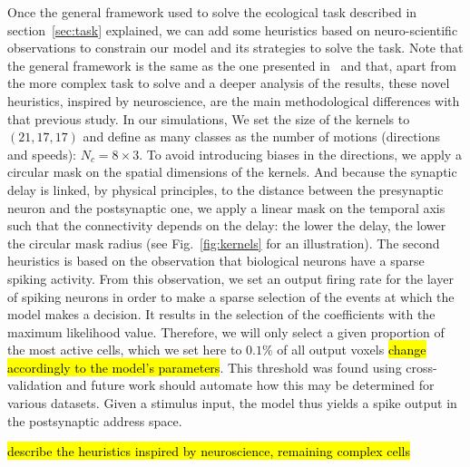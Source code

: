 \documentclass[default]{sn-jnl}%
\theoremstyle{thmstyleone}%
\theoremstyle{thmstyletwo}%
\theoremstyle{thmstylethree}%
\newcommand{\seeFig}[1]{see Fig.~\ref{fig:#1}}%
\newcommand{\class}{c} %
\newcommand{\note}[1]{{\sethlcolor{yellow}\hl{#1}}}
\begin{document}
Once the general framework used to solve the ecological task described in section~\ref{sec:task} explained, we can add some heuristics based on neuro-scientific observations to constrain our model and its strategies to solve the task. Note that the general framework is the same as the one presented in~\cite{grimaldi_learning_2022} and that, apart from the more complex task to solve and a deeper analysis of the results, these novel heuristics, inspired by neuroscience, are the main methodological differences with that previous study. In our simulations, We set the size of the kernels to $(21, 17, 17)$ and define as many classes as the number of motions (directions and speeds): $N_\class = 8 \times 3$. To avoid introducing biases in the directions, we apply a circular mask on the spatial dimensions of the kernels. And because the synaptic delay is linked, by physical principles, to the distance between the presynaptic neuron and the postsynaptic one, we apply a linear mask on the temporal axis such that the connectivity depends on the delay: the lower the delay, the lower the circular mask radius (\seeFig{kernels} for an illustration). The second heuristics is based on the observation that biological neurons have a sparse spiking activity. From this observation, we set an output firing rate for the layer of spiking neurons in order to make a sparse selection of the events at which the model makes a decision. It results in the selection of the coefficients with the maximum likelihood value. Therefore, we will only select a given proportion of the most active cells, which we set here to $0.1\%$ of all output voxels \note{change accordingly to the model's parameters}. This threshold was found using cross-validation and future work should automate how this may be determined for various datasets. Given a stimulus input, the model thus yields a spike output in the postsynaptic address space.

\note{describe the heuristics inspired by neuroscience, remaining complex cells}

\end{document}
